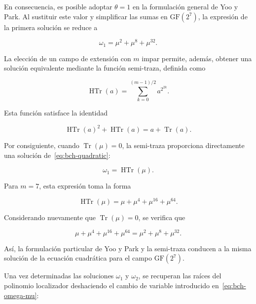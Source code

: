 \documentclass[10pt,a4paper]{article}
\begin{document}
En consecuencia, es posible adoptar $\theta=1$ en la
formulación general de Yoo y Park. Al sustituir este
valor y simplificar las sumas en $\mathrm{GF}(2^7)$,
la expresión de la primera solución se reduce a

\begin{equation}
    \omega_1=\mu^2+\mu^8+\mu^{32}.
    \label{eq:bch-omega-simplified}
\end{equation}

La elección de un campo de extensión con $m$ impar
permite, además, obtener una solución equivalente
mediante la función semi-traza, definida como

\begin{equation}
    \operatorname{HTr}(a)
    =
    \sum_{k=0}^{(m-1)/2}a^{2^{2k}}.
    \label{eq:bch-half-trace}
\end{equation}

Esta función satisface la identidad

\begin{equation}
    \operatorname{HTr}(a)^2+\operatorname{HTr}(a)
    =
    a+\operatorname{Tr}(a).
\end{equation}

Por consiguiente, cuando $\operatorname{Tr}(\mu)=0$,
la semi-traza proporciona directamente una solución
de~\eqref{eq:bch-quadratic}:

\begin{equation}
    \omega_1=\operatorname{HTr}(\mu).
\end{equation}

Para $m=7$, esta expresión toma la forma

\begin{equation}
    \operatorname{HTr}(\mu)
    =
    \mu+\mu^4+\mu^{16}+\mu^{64}.
\end{equation}

Considerando nuevamente que $\operatorname{Tr}(\mu)=0$,
se verifica que

\begin{equation}
    \mu+\mu^4+\mu^{16}+\mu^{64}
    =
    \mu^2+\mu^8+\mu^{32}.
\end{equation}

Así, la formulación particular de Yoo y Park y la
semi-traza conducen a la misma solución de la ecuación
cuadrática para el campo $\mathrm{GF}(2^7)$.

Una vez determinadas las soluciones $\omega_1$ y
$\omega_2$, se recuperan las raíces del polinomio
localizador deshaciendo el cambio de variable
introducido en~\eqref{eq:bch-omega-mu}:
\end{document}
